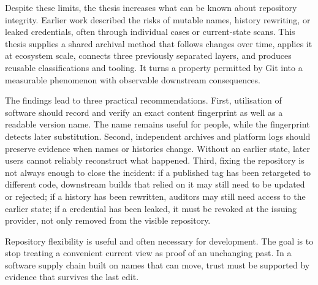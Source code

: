 \begin{SingleSpace}
Despite these limits, the thesis increases what can be known about repository integrity.
Earlier work described the risks of mutable names, history rewriting, or leaked credentials, often through individual cases or current-state scans.
This thesis supplies a shared archival method that follows changes over time, applies it at ecosystem scale, connects three previously separated layers, and produces reusable classifications and tooling.
It turns a property permitted by Git into a measurable phenomenon with observable downstream consequences.

The findings lead to three practical recommendations.
First, utilisation of software should record and verify an exact content fingerprint as well as a readable version name.
The name remains useful for people, while the fingerprint detects later substitution.
Second, independent archives and platform logs should preserve evidence when names or histories change.
Without an earlier state, later users cannot reliably reconstruct what happened.
Third, fixing the repository is not always enough to close the incident: if a published tag has been retargeted to different code, downstream builds that relied on it may still need to be updated or rejected; if a history has been rewritten, auditors may still need access to the earlier state; if a credential has been leaked, it must be revoked at the issuing provider, not only removed from the visible repository.

Repository flexibility is useful and often necessary for development.
The goal is to stop treating a convenient current view as proof of an unchanging past.
In a software supply chain built on names that can move, trust must be supported by evidence that survives the last edit.
\end{SingleSpace}
\clearpage

